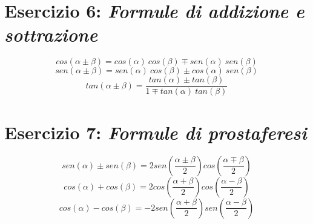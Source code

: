\documentclass[a4paper,11pt]{article}
\begin{document}
    \section*{Esercizio 6: \textit{Formule di addizione e sottrazione}}
    \begin{equation}
    cos(\alpha \pm \beta) = cos(\alpha)\ cos(\beta) \mp sen(\alpha)\ sen(\beta)
    \end{equation}
    \begin{equation}
    sen(\alpha \pm \beta) = sen(\alpha)\ cos(\beta) \pm cos(\alpha)\ sen(\beta)
    \end{equation}
    \begin{equation}
    tan(\alpha \pm \beta) = \frac{tan(\alpha) \pm tan(\beta)}{1 \mp tan(\alpha)\ tan(\beta)}
    \end{equation}

    \section*{Esercizio 7: \textit{Formule di prostaferesi}}
    \begin{equation} sen(\alpha) \pm sen(\beta) = 2sen\left(\frac{\alpha \pm \beta}{2}\right)cos\left(\frac{\alpha \mp \beta}{2}\right) \end{equation}
    \begin{equation} cos(\alpha) + cos(\beta) = 2cos\left(\frac{\alpha + \beta}{2}\right)cos\left(\frac{\alpha - \beta}{2}\right) \end{equation}
    \begin{equation} cos(\alpha) - cos(\beta) = -2sen\left(\frac{\alpha + \beta}{2}\right)sen\left(\frac{\alpha - \beta}{2}\right) \end{equation}
\end{document}
